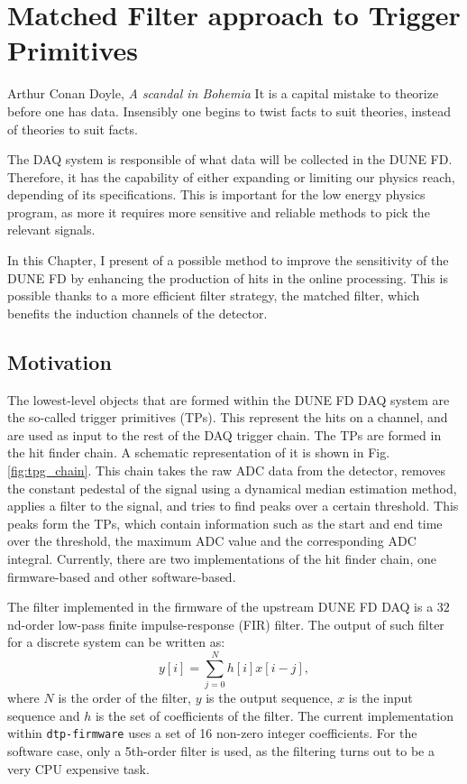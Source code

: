 \chapter{Matched Filter approach to Trigger Primitives}\label{chapter:matched_filter}

\begin{chapquote}{Arthur Conan Doyle, \textit{A scandal in Bohemia}}
	It is a capital mistake to theorize before one has data. Insensibly one begins to twist facts to suit theories, instead of theories to suit facts.
\end{chapquote}

The DAQ system is responsible of what data will be collected in the DUNE FD. Therefore, it has the capability of either expanding or limiting our physics reach, depending of its specifications. This is important for the low energy physics program, as more it requires more sensitive and reliable methods to pick the relevant signals.

In this Chapter, I present of a possible method to improve the sensitivity of the DUNE FD by enhancing the production of hits in the online processing. This is possible thanks to a more efficient filter strategy, the matched filter, which benefits the induction channels of the detector.

\section{Motivation}
\label{sec:2.1}

The lowest-level objects that are formed within the DUNE FD DAQ system are the so-called trigger primitives (TPs). This represent the hits on a channel, and are used as input to the rest of the DAQ trigger chain. The TPs are formed in the hit finder chain. A schematic representation of it is shown in Fig. \ref{fig:tpg_chain}. This chain takes the raw ADC data from the detector, removes the constant pedestal of the signal using a dynamical median estimation method, applies a filter to the signal, and tries to find peaks over a certain threshold. This peaks form the TPs, which contain information such as the start and end time over the threshold, the maximum ADC value and the corresponding ADC integral. Currently, there are two implementations of the hit finder chain, one firmware-based and other software-based.

The filter implemented in the firmware of the upstream DUNE FD DAQ is a $32$nd-order low-pass finite impulse-response (FIR) filter. The output of such filter for a discrete system can be written as:
\begin{equation}\label{2.1.1}
	y[i] = \sum_{j=0}^{N} h[i] x[i-j],
\end{equation}
where $N$ is the order of the filter, $y$ is the output sequence, $x$ is the input sequence and $h$ is the set of coefficients of the filter. The current implementation within \texttt{dtp-firmware} \cite{dtp-firmware} uses a set of 16 non-zero integer coefficients. For the software case, only a 5th-order filter is used, as the filtering turns out to be a very CPU expensive task.

